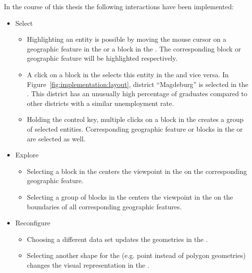 In the course of this thesis the following interactions have been implemented:
\begin{itemize}
  \item
    Select

    \begin{itemize}
      \item
        Highlighting an entity is possible by moving the mouse cursor on a geographic feature in the \gv{} or a block in the \tmap{}.
        The corresponding block or geographic feature will be highlighted respectively.
      \item
        A click on a block in the \tmap{} selects this entity in the \gv{} and vice versa.
        In Figure~\ref{fig:implementation:layout}, district ``Magdeburg'' is selected in the \gv{}.
        This district has an unusually high percentage of graduates compared to other districts with a similar unemployment rate.
      \item
        Holding the control key, multiple clicks on a block in the \tmap{} creates a group of selected entities.
        Corresponding geographic feature or blocks in the \tmap{} or \gv{} are selected as well.
    \end{itemize}

  \item
    Explore

    \begin{itemize}
      \item Selecting a block in the \tmap{} centers the viewpoint in the \gv{} on the corresponding geographic feature.
      \item Selecting a group of blocks in the \tmap{} centers the viewpoint in the \gv{} on the boundaries of all corresponding geographic features.
    \end{itemize}

  \item
    Reconfigure

    \begin{itemize}
      \item
        Choosing a different data set updates the geometries in the \gv{}.
      \item
        Selecting another shape for the \tmap{} (e.g. point instead of polygon geometries) changes the visual representation in the \gv{}.
    \end{itemize}

\end{itemize}


